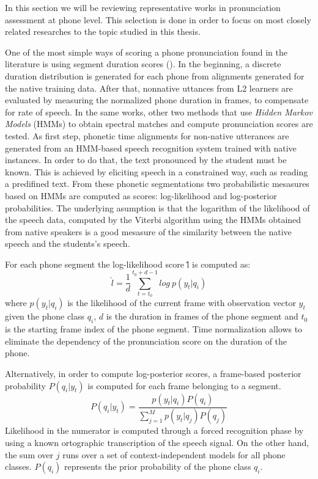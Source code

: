 In this section we will be reviewing representative works in pronunciation assessment
at phone level. This selection is done in order to focus on most closely related researches to
the topic studied in this thesis.

One of the most simple ways of scoring a phone pronunciation found in the literature 
is using segment duration scores (\cite{pronunciation_scoring_instruction}\cite{pronunciation_scoring_phone_segments_instruction}). In the beginning, a discrete duration 
distribution is generated for each phone from alignments generated for the native 
training data. After that, nonnative uttances from L2 learners are evaluated by measuring the 
normalized phone duration in frames, to compensate for rate of speech. 
In the same works, other two methods that use \textit{Hidden Markov Models} (HMMs) to obtain 
spectral matches and compute pronunciation scores are tested. 
As first step, phonetic time alignments for
non-native utterances are generated from an HMM-based speech recognition system trained
with native instances. In order to do that, the text pronounced by the student 
must be known. This is achieved by eliciting speech in a
constrained way, such as reading a predifined text.
From these phonetic segmentations two 
probabilistic mesasures based on HMMs are computed as scores: log-likelihood and 
log-posterior probabilities. The underlying asumption is that the logarithm of the likelihood
of the speech data, computed by the Viterbi algorithm using the HMMs obtained from native
speakers is a good mesasure of the similarity between the native speech and the students's
speech.

For each phone segment the log-likelihood score \^{l} is computed as:
\begin{equation}
\hat{l} = \frac{1}{d} \sum_{t=t_{0}}^{t_{0}+d-1} log \ p(y_{t}|q_{i})
\end{equation}
where $p(y_{t}|q_{i})$ is the likelihood of the current frame with observation vector $y_{t}$
given the phone class $q_{i}$, $d$ is the duration in frames of the phone segment 
and $t_{0}$ is the starting frame index of the phone segment. Time normalization allows to 
eliminate the dependency of the pronunciation score on the duration of the phone.

Alternatively, in order to compute log-posterior scores, a frame-based posterior probability
$P(q_{i}|y_{t})$ is computed for each frame belonging to a segment.
\begin{equation}
P(q_{i}|y_{t}) = \frac{p(y_{t}|q_{i})P(q_{i})}{\sum\limits_{j=1}^{M} p(y_{t}|q_{j})P(q_{j})}
\end{equation}
Likelihood in the numerator is computed through a forced recognition phase by using a known 
ortographic transcription of the speech signal. On the other hand, 
the sum over $j$ runs over a set of context-independent models for all phone classes. $P(q_{i})$
represents the prior probability of the phone class $q_{i}$. 

